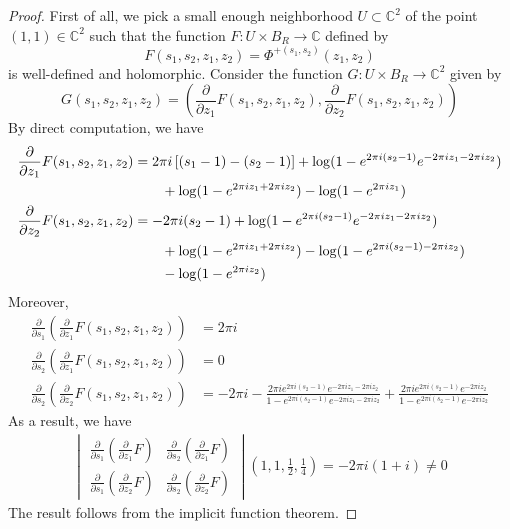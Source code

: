 \documentclass[10pt,a4paper]{article}
\newcommand{\lt}{\left}
\newcommand{\rt}{\right}
\def \CC{\mathbb C}
\def\CC{{\mathbb C}}
\begin{document}
\begin{proof} First of all, we pick a small enough neighborhood $U \subset \CC^2$ of the point $(1,1)\in \CC^2$ such that the function $F: U\times B_R \to \CC$ defined by
$$F(s_1,s_2, z_1,z_2) = \Phi^{+(s_1,s_2)}(z_1,z_2)$$
is well-defined and holomorphic. Consider the function $G:U \times B_R \to \CC^2$ given by
$$ G(s_1,s_2,z_1,z_2) = \lt(\frac{\partial}{\partial z_1} F(s_1,s_2, z_1,z_2), \frac{\partial}{\partial z_2} F(s_1,s_2, z_1,z_2)\rt) $$
By direct computation, we have
\begin{align}
\frac{\partial}{\partial z_1} F(s_1,s_2, z_1,z_2)
&= 2\pi i\lt[(s_1 - 1) - (s_2 - 1) \rt] + \log(1-e^{2\pi i (s_2 -1)}e^{-2\pi i z_1 - 2\pi i z_2})  \notag\\
& \qquad + \log(1 - e^{2\pi i z_1 + 2\pi i z_2}) - \log(1 - e^{2\pi i z_1}) \\
\frac{\partial}{\partial z_2} F(s_1,s_2, z_1,z_2) 
&= -  2\pi i  (s_2 - 1) + \log(1-e^{2\pi i (s_2 -1)}e^{-2\pi i z_1 - 2\pi i z_2}) \notag\\
&\qquad + \log(1 - e^{2\pi i z_1 + 2\pi i z_2}) - \log(1 - e^{2\pi i (s_2 - 1) - 2\pi i z_2}) \notag \\
&\qquad - \log(1 - e^{2\pi i z_2}) 
\end{align}
Moreover,
\begin{align}
\frac{\partial}{\partial s_1} \lt( \frac{\partial}{\partial z_1} F(s_1,s_2, z_1,z_2) \rt)
&= 2\pi i  \\
\frac{\partial}{\partial s_2} \lt( \frac{\partial}{\partial z_1} F(s_1,s_2, z_1,z_2) \rt)
&= 0 \\
\frac{\partial}{\partial s_2} \lt( \frac{\partial}{\partial z_2} F(s_1,s_2, z_1,z_2) \rt)
&= -2\pi i - \frac{2\pi i e^{2\pi i (s_2 -1)}e^{-2\pi i z_1 - 2\pi i z_2}}{1-e^{2\pi i (s_2 -1)}e^{-2\pi i z_1 - 2\pi i z_2}} + \frac{2\pi i e^{2\pi i (s_2 -1)}e^{- 2\pi i z_2}}{1-e^{2\pi i (s_2 -1)}e^{- 2\pi i z_2}} 
\end{align}
As a result, we have
\begin{align}
\begin{vmatrix}
\frac{\partial}{\partial s_1} \lt( \frac{\partial}{\partial z_1} F \rt)
&
\frac{\partial}{\partial s_2} \lt( \frac{\partial}{\partial z_1} F \rt) \\
\frac{\partial}{\partial s_1} \lt( \frac{\partial}{\partial z_2} F \rt) 
&
\frac{\partial}{\partial s_2} \lt( \frac{\partial}{\partial z_2} F\rt)
\end{vmatrix}
\lt(1,1,\frac{1}{2}, \frac{1}{4}\rt)
= -2\pi i (1+i) 
\neq 0
\end{align}
The result follows from the implicit function theorem.
\end{proof}
\end{document}
